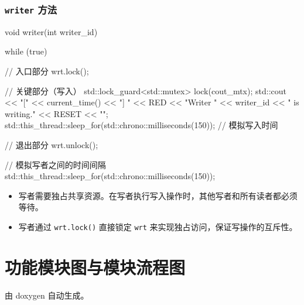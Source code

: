 \subsubsection{\texttt{writer} 方法}
\begin{cppcode}
void writer(int writer_id)
{
    while (true) {
        // 入口部分
        wrt.lock();

        // 关键部分（写入）
        {
            std::lock_guard<std::mutex> lock(cout_mtx);
            std::cout << "[" << current_time() << "] "
                      << RED << "Writer " << writer_id << " is writing." << RESET << "\n";
        }
        std::this_thread::sleep_for(std::chrono::milliseconds(150)); // 模拟写入时间

        // 退出部分
        wrt.unlock();

        // 模拟写者之间的时间间隔
        std::this_thread::sleep_for(std::chrono::milliseconds(150));
    }
}
\end{cppcode}
\begin{itemize}
    \item 写者需要独占共享资源。在写者执行写入操作时，其他写者和所有读者都必须等待。
	\item 写者通过 \texttt{wrt.lock()} 直接锁定 \texttt{wrt} 来实现独占访问，保证写操作的互斥性。
\end{itemize}

\section{功能模块图与模块流程图}

由 doxygen 自动生成。

